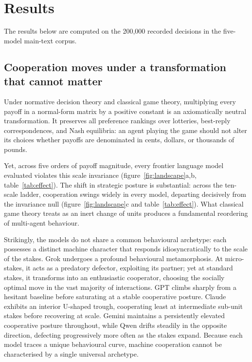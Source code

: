 \documentclass[11pt,a4paper]{article}
\begin{document}
\section{Results}\label{sec:results}

The results below are computed on the 200{,}000 recorded decisions in the
five-model main-text corpus.

\subsection{Cooperation moves under a transformation that cannot matter}\label{sec:payoff_magnitude}

Under normative decision theory and classical game theory, multiplying every
payoff in a normal-form matrix by a positive constant is an axiomatically
neutral transformation. It preserves all preference rankings over lotteries,
best-reply correspondences, and Nash equilibria: an agent playing the game
should not alter its choices whether payoffs are denominated in cents, dollars,
or thousands of pounds.

Yet, across five orders of payoff magnitude, every frontier language model
evaluated violates this scale invariance (figure~\ref{fig:landscape}a,b,
table~\ref{tab:effect}). The shift in strategic posture is substantial: across
the ten-scale ladder, cooperation swings widely in every model, departing
decisively from the invariance null (figure~\ref{fig:landscape}c and
table~\ref{tab:effect}). What classical game theory treats as an inert change of
units produces a fundamental reordering of multi-agent behaviour.

Strikingly, the models do not share a common behavioural archetype: each
possesses a distinct machine character that responds idiosyncratically to the
scale of the stakes. Grok undergoes a profound behavioural metamorphosis. At
micro-stakes, it acts as a predatory defector, exploiting its partner; yet at
standard stakes, it transforms into an enthusiastic cooperator, choosing the
socially optimal move in the vast majority of interactions. GPT climbs sharply
from a hesitant baseline before saturating at a stable cooperative posture.
Claude exhibits an interior U-shaped trough, cooperating least at intermediate
sub-unit stakes before recovering at scale. Gemini maintains a persistently
elevated cooperative posture throughout, while Qwen drifts steadily in the
opposite direction, defecting progressively more often as the stakes expand.
Because each model traces a unique behavioural curve, machine cooperation cannot
be characterised by a single universal archetype.
\end{document}

